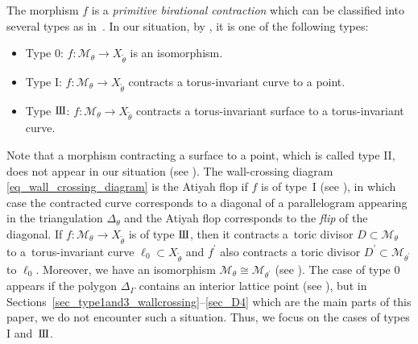 \documentclass[pdftex]{sigma}
\numberwithin{equation}{section}
\theoremstyle{definition}
\newcommand{\calM}{\mathcal{M}}
\newcommand{\typeII}{{\rm I\hspace{-0.7pt}I}}
\newcommand{\typeIII}{{\rm I\hspace{-0.7pt}I\hspace{-0.7pt}I}}
\begin{document}
The morphism $f$ is a \emph{primitive birational contraction} which can be classified into several types as in~\cite{Wil_walltypes}.
In our situation, by \cite[Section~11]{IU_anycrepant}, it is one of the following types:
\begin{itemize}\itemsep=0pt
\item Type $0$: $f\colon \calM_\theta\rightarrow X_{\tilde{\theta}}$ is an isomorphism.
\item Type I: $f\colon \calM_\theta\rightarrow X_{\tilde{\theta}}$ contracts a torus-invariant curve to a point.
\item Type $\typeIII$: $f\colon \calM_\theta\rightarrow X_{\tilde{\theta}}$ contracts a torus-invariant surface to a torus-invariant curve.
\end{itemize}
Note that a morphism contracting a surface to a point, which is called type \typeII, does not appear in our situation (see \cite[Lemma~10.5]{IU_anycrepant}).
The wall-crossing diagram \eqref{eq_wall_crossing_diagram} is the Atiyah flop if $f$ is of type~I (see \cite[Lemma~11.26]{IU_anycrepant}),
in which case the contracted curve corresponds to a diagonal of a parallelogram appearing in the triangulation $\Delta_\theta$ and
the Atiyah flop corresponds to the \emph{flip} of the diagonal.
If $f\colon \calM_\theta\rightarrow X_{\tilde{\theta}}$ is of type $\typeIII$, then it contracts a~toric divisor $D\subset\calM_\theta$ to a~torus-invariant curve $\ell_0\subset X_{\tilde{\theta}}$ and $f^\prime$ also contracts a toric divisor $D^\prime\subset\calM_{\theta^\prime}$ to $\ell_0$.
Moreover, we have an isomorphism $\calM_\theta\cong\calM_{\theta^\prime}$ (see \cite[Lemma~11.29]{IU_anycrepant}).
The case of type $0$ appears if the polygon $\Delta_\Gamma$ contains an interior lattice point (see \cite[Section~11.1]{IU_anycrepant}),
but in Sections~\ref{sec_type1and3_wallcrossing}--\ref{sec_D4} which are the main parts of this paper, we do not encounter such a situation.
Thus, we focus on the cases of types I and~$\typeIII$.
\end{document}
